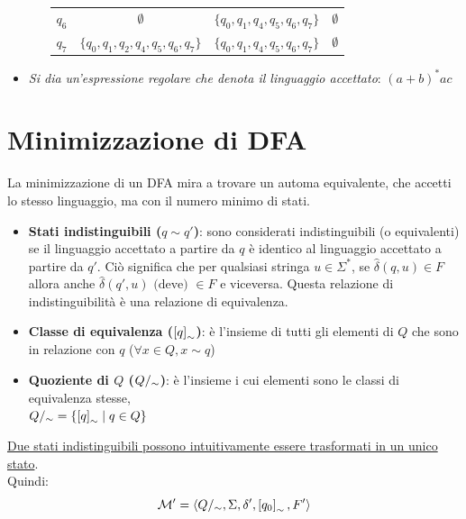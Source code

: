 \documentclass[12pt, a4paper]{report}
\begin{document}
\begin{exercise}
\begin{itemize}
\begin{itemize}
\begin{center}
\begin{tabular}{|c|c|c|c|}
                                    $q_6$ & $\emptyset$ & $\{q_0,q_1,q_4,q_5,q_6,q_7\}$ & $\emptyset$ \\
                                    $q_7$ & $\{q_0,q_1,q_2,q_4,q_5,q_6,q_7\}$ & $\{q_0,q_1,q_4,q_5,q_6,q_7\}$ & $\emptyset$ \\
                                    \hline
                                \end{tabular}
                            \end{center}
                        \end{itemize}
                        \item \textit{Si dia un'espressione regolare che denota il linguaggio accettato}: $(a+b)^*ac$
                    \end{itemize}
                \end{exercise}
        \section{Minimizzazione di DFA}
            La minimizzazione di un DFA mira a trovare un automa equivalente, che accetti lo stesso linguaggio, ma con il numero minimo di stati.
            \begin{itemize}
                \item \textbf{Stati indistinguibili ($q\sim q'$)}: sono considerati indistinguibili (o equivalenti) se il linguaggio accettato a partire da $q$ è identico al linguaggio accettato a partire da $q'$. Ciò significa che per qualsiasi stringa $u\in\Sigma^*$, se $\hat{\delta}(q,u)\in F$ allora anche $\hat{\delta}(q',u)\text{ (deve) }\in F$ e viceversa. Questa relazione di indistinguibilità è una relazione di equivalenza.
                \item \textbf{Classe di equivalenza ($\left[q\right]_\sim$)}: è l'insieme di tutti gli elementi di $Q$ che sono in relazione con $q$ ($\forall x\in Q, x\sim q$)
                \item \textbf{Quoziente di $Q$ ($Q/_\sim$)}: è l'insieme i cui elementi sono le classi di equivalenza stesse,\\
                $Q/_\sim=\{\left[q\right]_\sim\mid q\in Q\}$
            \end{itemize}
            \underline{Due stati indistinguibili possono intuitivamente essere trasformati in un unico stato}.\\
            Quindi:
            \begin{equation*}
                \mathcal{M'}=\langle Q/_\sim,\Sigma,\delta',\left[q_0\right]_\sim,F'\rangle
            \end{equation*}
\end{document}
